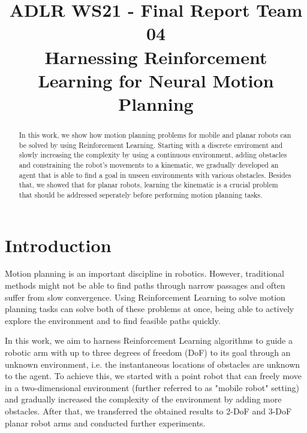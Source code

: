 \documentclass[conference]{IEEEtran}
\begin{document}
\title{ADLR WS21 - Final Report Team 04 \\ Harnessing Reinforcement Learning for Neural Motion Planning\\
}

\author{
\and
{}
}

\maketitle

\begin{abstract}
	In this work, we show how motion planning problems for mobile and planar robots can be solved by using Reinforcement Learning. Starting with a discrete enviroment and slowly increasing the complexity by using a continuous environment, adding obstacles and constraining the robot's movements to a kinematic, we gradually developed an agent that is able to find a goal in unseen environments with various obstacles. Besides that, we showed that for planar robots, learning the kinematic is a crucial problem that should be addressed seperately before performing motion planning tasks.
\end{abstract}

\section{Introduction}
Motion planning is an important discipline in robotics. However, traditional methods might not be able to find paths through narrow passages and often suffer from slow convergence. Using Reinforcement Learning to solve motion planning tasks can solve both of these problems at once, being able to actively explore the environment and to find feasible paths quickly.

 In this work, we aim to harness Reinforcement Learning algorithms to guide a robotic arm with up to three degrees of freedom (DoF) to its goal through an unknown environment, i.e. the instantaneous locations of obstacles are unknown to the agent. To achieve this, we started with a point robot that can freely move in a two-dimensional environment (further referred to as "mobile robot" setting) and gradually increased the complexity of the environment by adding more obstacles. After that, we transferred the obtained results to 2-DoF and 3-DoF planar robot arms and conducted further experiments.
\end{document}
